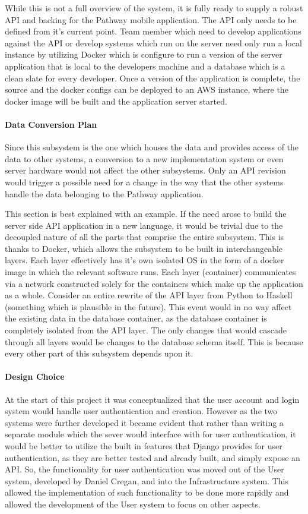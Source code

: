 \documentclass{article}
\begin{document}
While this is not a full overview of the system, it is fully ready to supply a robust
API and backing for the Pathway mobile application. The API only needs to be defined
from it's current point. Team member which need to develop applications against the API
or develop systems which run on the server need only run a local instance by utilizing
Docker which is configure to run a version of the server application that is local to the
developers machine and a database which is a clean slate for every developer. Once
a version of the application is complete, the source and the docker configs can be deployed
to an AWS instance, where the docker image will be built and the application server started.

\paragraph{Data Conversion Plan}
Since this subsystem is the one which houses the data and provides access of the data to other systems,
a conversion to a new implementation system or even server hardware would not affect the other subsystems.
Only an API revision would trigger a possible need for a change in the way that the other systems handle the
data belonging to the Pathway application.

This section is best explained with an example. If the need arose to build the server side
API application in a new language, it would be trivial due to the decoupled nature of all the
parts that comprise the entire subsystem. This is thanks to Docker, which allows the subsystem
to be built in interchangeable layers. Each layer effectively has it's own isolated OS in the form of
a docker image in which the relevant software runs. Each layer (container) communicates via a
network constructed solely for the containers which make up the application as a whole. Consider
an entire rewrite of the API layer from Python to Haskell (something which is plausible in the future).
This event would in no way affect the existing data in the database container, as the database container
is completely isolated from the API layer. The only changes that would cascade through all layers would
be changes to the database schema itself. This is because every other part of this subsystem depends upon it.

\paragraph{Design Choice}
At the start of this project it was conceptualized that the user account and login system would handle
user authentication and creation. However as the two systems were further developed it became evident that
rather than writing a separate module which the sever would interface with for user authentication, it would
be better to utilize the built in features that Django provides for user authentication, as they are
better tested and already built, and simply expose an API. So, the functionality for user authentication
was moved out of the User system, developed by Daniel Cregan, and into the Infrastructure system.
This allowed the implementation of such functionality to be done more rapidly and allowed the development
of the User system to focus on other aspects.
\end{document}

